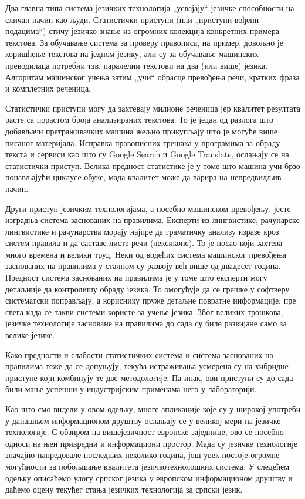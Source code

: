 \begin{multicols}{2}

Два главна типа система језичких технологија „усвајају“ језичке способности на сличан начин као људи. Статистички приступи  (или „приступи вођени подацима“) стичу језичко знање из огромних колекција конкретних примера текстова. За обучавање система за проверу правописа, на пример, довољно је коришћење текстова на једном језику, али су за обучавање машинских преводилаца потребни тзв. паралелни текстови на два (или више) језика. Алгоритам машинског учења затим „учи“ обрасце превођења речи, кратких фраза и комплетних реченица. 

Статистички приступи могу да захтевају милионе реченица јер квалитет резултата расте са порастом броја анализираних текстова. То је један од разлога што добављачи претраживачких машина жељно прикупљају што је могуће више писаног материјала. Исправка правописних грешака у програмима за обраду текста и сервиси као што су Google Search и  Google Translate, ослањају се на статистички приступ. Велика предност статистике је у томе што машина учи брзо по\-нав\-ља\-ју\-ћи циклусе обуке, мада квалитет може да варира на непредвидљив начин. 

Други приступ језичким технологијама, а посебно машинском превођењу, јесте изградња система заснованих на правилима. Експерти из лингвистике, рачунарске лингвистике и рачунарства морају најпре да граматичку анализу изразе кроз систем правила и да саставе листе речи (лексиконе). То је посао који захтева много времена и велики труд. Неки од водећих система машинског превођења заснованих на правилима у сталном су развоју већ више од двадесет година. Предност система заснованих на правилима је у томе што експерти могу детаљније да контролишу обраду језика. То омогућује да се грешке у софтверу систематски поправљају, а кориснику пруже детаљне повратне информације, пре свега када се такви системи користе за учење језика. Због великих трошкова, језичке технологије засноване на правилима до сада су биле развијане само за велике језике.  

Како предности и слабости статистичких система и система заснованих на правилима теже да се допуњују, текућа истраживања усмерена су на хибридне приступе који комбинују те две методологије. Па ипак, ови приступи су до сада били мање успешни у индустријским применама него у лабораторији. 

Као што смо видели у овом одељку, многе апликације које су у широкој употреби у данашњем информационом друштву ослањају се у великој мери на језичке технологије. С обзиром на вишејезичност европске заједнице, ово се посебно односи на њен привредни и информациони простор. Мада су језичке технологије значајно напредовале последњих неколико година, још увек постоје огромне могућности за побољшање квалитета језичкотехнолошких система. У следећем одељку описаћемо улогу српског језика у европском информационом друштву и даћемо оцену текућег стања језичких технологија за српски језик. 

\end{multicols}

